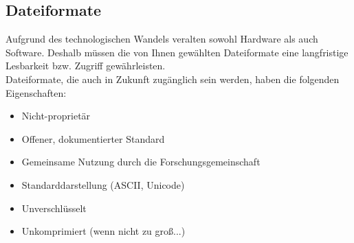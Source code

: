 \subsection{Dateiformate}
Aufgrund des technologischen Wandels veralten sowohl Hardware als auch Software.
Deshalb müssen die von Ihnen gewählten Dateiformate eine langfristige Lesbarkeit
bzw. Zugriff gewährleisten.\\
Dateiformate, die auch in Zukunft zugänglich sein werden, haben die folgenden
Eigenschaften:
\begin{itemize}
  \item Nicht-proprietär
  \item Offener, dokumentierter Standard
  \item Gemeinsame Nutzung durch die Forschungsgemeinschaft
  \item Standarddarstellung (ASCII, Unicode)
  \item Unverschlüsselt
  \item Unkomprimiert (wenn nicht zu groß...)
\end{itemize}

